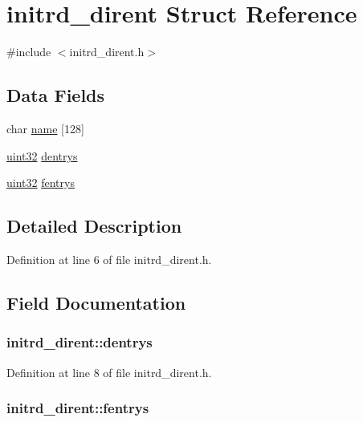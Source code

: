 \hypertarget{structinitrd__dirent}{
\section{initrd\_\-dirent Struct Reference}
\label{structinitrd__dirent}
}


{\ttfamily \#include $<$initrd\_\-dirent.h$>$}

\subsection*{Data Fields}
\begin{DoxyCompactItemize}
\item 
char \hyperlink{structinitrd__dirent_ae20cd12c5ee50add1bb05e9c4d384d91}{name} \mbox{[}128\mbox{]}
\item 
\hyperlink{int__types_8h_a1134b580f8da4de94ca6b1de4d37975e}{uint32} \hyperlink{structinitrd__dirent_ab0febe2d6b773433a2b4aba876f72c47}{dentrys}
\item 
\hyperlink{int__types_8h_a1134b580f8da4de94ca6b1de4d37975e}{uint32} \hyperlink{structinitrd__dirent_a05e02f2eddfcf1af42c6fddae908157c}{fentrys}
\end{DoxyCompactItemize}


\subsection{Detailed Description}


Definition at line 6 of file initrd\_\-dirent.h.



\subsection{Field Documentation}
\hypertarget{structinitrd__dirent_ab0febe2d6b773433a2b4aba876f72c47}{
\subsubsection[{dentrys}]{ {\bf initrd\_\-dirent::dentrys}}}
\label{structinitrd__dirent_ab0febe2d6b773433a2b4aba876f72c47}


Definition at line 8 of file initrd\_\-dirent.h.

\hypertarget{structinitrd__dirent_a05e02f2eddfcf1af42c6fddae908157c}{
\subsubsection[{fentrys}]{ {\bf initrd\_\-dirent::fentrys}}}
\label{structinitrd__dirent_a05e02f2eddfcf1af42c6fddae908157c}


